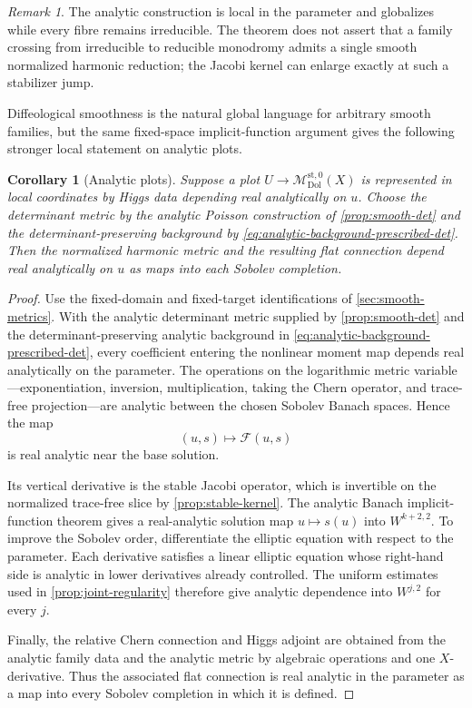 \documentclass[11pt,reqno]{amsart}
\newtheorem{corollary}[theorem]{Corollary}
\theoremstyle{definition}
\theoremstyle{remark}
\newtheorem{remark}[theorem]{Remark}
\newcommand{\cF}{\mathcal F}
\newcommand{\Dol}{\mathrm{Dol}}
\newcommand{\st}{\mathrm{st}}
\newcommand{\MdiffDol}{\mathscr M_{\Dol}}
\begin{document}
\begin{remark}
The analytic construction is local in the parameter and globalizes while every fibre remains irreducible.  The theorem does not assert that a family crossing from irreducible to reducible monodromy admits a single smooth normalized harmonic reduction; the Jacobi kernel can enlarge exactly at such a stabilizer jump.
\end{remark}


Diffeological smoothness is the natural global language for arbitrary
smooth families, but the same fixed-space implicit-function argument
gives the following stronger local statement on analytic plots.

\begin{corollary}[Analytic plots]\label{cor:analytic-plots}
Suppose a plot $U\to\MdiffDol^{\st,0}(X)$ is represented in local coordinates by Higgs data depending real analytically on $u$.  Choose the determinant metric by the analytic Poisson construction of \cref{prop:smooth-det} and the determinant-preserving background by \eqref{eq:analytic-background-prescribed-det}.  Then the normalized harmonic metric and the resulting flat connection depend real analytically on $u$ as maps into each Sobolev completion.
\end{corollary}

\begin{proof}
Use the fixed-domain and fixed-target identifications of \cref{sec:smooth-metrics}.  With the analytic determinant metric supplied by \cref{prop:smooth-det} and the determinant-preserving analytic background in \eqref{eq:analytic-background-prescribed-det}, every coefficient entering the nonlinear moment map depends real analytically on the parameter.  The operations on the logarithmic metric variable---exponentiation, inversion, multiplication, taking the Chern operator, and trace-free projection---are analytic between the chosen Sobolev Banach spaces.  Hence the map
\[
  (u,s)\longmapsto\cF(u,s)
\]
is real analytic near the base solution.

Its vertical derivative is the stable Jacobi operator, which is invertible on the normalized trace-free slice by \cref{prop:stable-kernel}.  The analytic Banach implicit-function theorem gives a real-analytic solution map $u\mapsto s(u)$ into $W^{k+2,2}$.  To improve the Sobolev order, differentiate the elliptic equation with respect to the parameter.  Each derivative satisfies a linear elliptic equation whose right-hand side is analytic in lower derivatives already controlled.  The uniform estimates used in \cref{prop:joint-regularity} therefore give analytic dependence into $W^{j,2}$ for every $j$.

Finally, the relative Chern connection and Higgs adjoint are obtained from the analytic family data and the analytic metric by algebraic operations and one $X$-derivative.  Thus the associated flat connection is real analytic in the parameter as a map into every Sobolev completion in which it is defined.
\end{proof}
\end{document}
